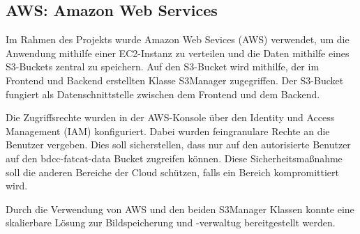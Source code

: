 \subsection{AWS: Amazon Web Services}
Im Rahmen des Projekts wurde Amazon Web Sevices (AWS) verwendet, um die Anwendung mithilfe einer EC2-Instanz zu verteilen und die Daten mithilfe eines S3-Buckets zentral zu speichern. Auf den
S3-Bucket wird mithilfe, der im Frontend und Backend erstellten Klasse \glqq S3Manager\grqq{} zugegriffen. Der S3-Bucket fungiert als Datenschnittstelle zwischen dem Frontend und dem Backend.

Die Zugriffsrechte wurden in der AWS-Konsole über den Identity und Access Management (IAM) konfiguriert. Dabei wurden feingranulare Rechte an die Benutzer 
vergeben. Dies soll sicherstellen, dass nur auf den autorisierte Benutzer auf den \glqq bdcc-fatcat-data\grqq{} Bucket zugreifen können. Diese Sicherheitsmaßnahme soll die anderen Bereiche der Cloud schützen, falls ein Bereich kompromittiert wird.

Durch die Verwendung von AWS und den beiden S3Manager Klassen konnte eine skalierbare Lösung zur Bildspeicherung und -verwaltug bereitgestellt werden.